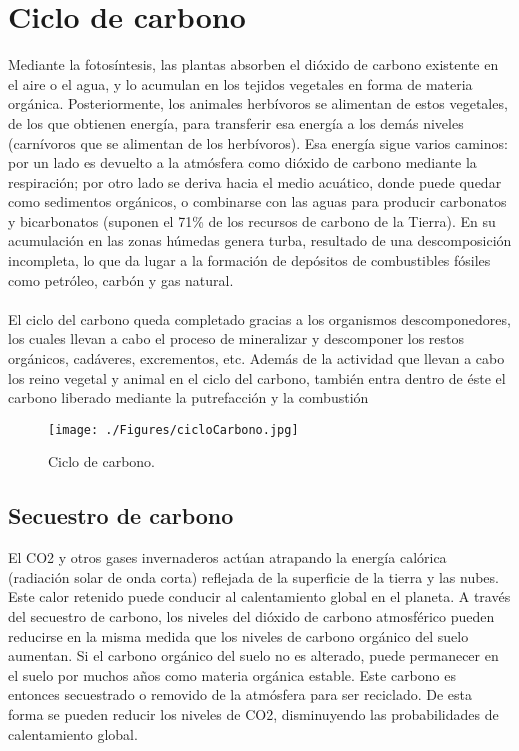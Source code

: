 \section{Ciclo de carbono}
Mediante la fotos\'intesis, las plantas absorben el dióxido de carbono existente en el aire o el agua, y lo acumulan en los tejidos vegetales en forma de materia org\'anica. Posteriormente, los animales herb\'ivoros se alimentan de estos vegetales, de los que obtienen energía, para transferir esa energ\'ia a los dem\'as niveles (carnívoros que se alimentan de los herb\'ivoros).
Esa energía sigue varios caminos: por un lado es devuelto a la atm\'osfera como di\'oxido de carbono mediante la respiraci\'on; por otro lado se deriva hacia el medio acu\'atico, donde puede quedar como sedimentos org\'anicos, o combinarse con las aguas para producir carbonatos y bicarbonatos (suponen el 71\% de los recursos de carbono de la Tierra). En su acumulaci\'on en las zonas h\'umedas genera turba, resultado de una descomposición incompleta, lo que da lugar a la formaci\'on de dep\'ositos de combustibles f\'osiles como petr\'oleo, carb\'on y gas natural.\\~\\
El ciclo del carbono queda completado gracias a los organismos des\-componedores, los cuales llevan a cabo el proceso de mineralizar y descomponer los restos org\'anicos, cad\'averes, excrementos, etc. Adem\'as de la actividad que llevan a cabo los reino vegetal y animal en el ciclo del carbono, también entra dentro de \'este el carbono liberado mediante la putrefacci\'on y la combusti\'on\cite{natur2015PW}
    \begin{figure}[!hbtp]
    	\centering
    	\texttt{[image: ./Figures/cicloCarbono.jpg]}
    	\caption{Ciclo de carbono.}
    	\label{fig:ciclocarbono}
    \end{figure}


\subsection{Secuestro de carbono}
El CO2 y otros gases invernaderos actúan atrapando la energ\'ia cal\'orica (radiación solar de onda corta) reflejada de la superficie de la tierra y las nubes. Este calor retenido puede conducir al calentamiento global en el planeta. A trav\'es del secuestro de carbono, los niveles del di\'oxido de carbono atmosf\'erico pueden reducirse en la misma medida que los niveles de carbono org\'anico del suelo aumentan. Si el carbono org\'anico del suelo no es alterado, puede permanecer en el suelo por muchos a\~{n}os como materia org\'anica estable. Este carbono es entonces secuestrado o removido de la atm\'osfera para ser reciclado. De esta forma se pueden reducir los niveles de CO2, disminuyendo las probabilidades de calentamiento global\cite{encaptura}.
